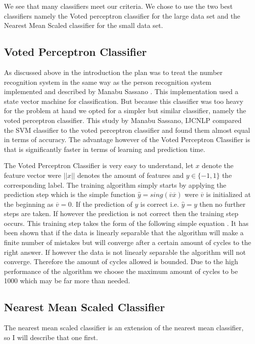 \documentclass[%
        compressed,
        final,
        notitlepage,
        narroweqnarray,
        inline,
        twoside,
        ]{ieee}
\begin{document}
We see that many classifiers meet our criteria. We chose to use the two best
classifiers namely the Voted perceptron classifier for the large data set and
the Nearest Mean Scaled classifier for the small data set.

\subsection{Voted Perceptron Classifier}
As discussed above in the introduction the plan was to treat the number
recognition system in the same way as the person recognition system implemented
and described by Manabu Sassano \cite{Manabu}.
This implementation used a state vector machine for classification. But because
this classifier was too heavy for the problem at hand we opted for a simpler but
similar classifier, namely the voted perceptron classifier. This study by Manabu
Sassano, IJCNLP compared the SVM classifier to the voted perceptron classifier
and found them almost equal in terms of accuracy. The advantage however of the
Voted Perceptron Classifier is that is significantly faster in terms of learning
and prediction time.

The Voted Perceptron Classifier is very easy to understand, let $x$ denote the
feature vector were $||x||$ denotes the amount of features and $y \in \{-1,1\}$
the corresponding label. The training algorithm simply starts by applying the
prediction step which is the simple function $\hat{y} =
sing(\overline{v}\overline{x})$ were $\overline{v}$ is
initialized at the beginning as $\overline{v}=0$. If the prediction of $y$ is correct i.e.
$\hat{y}=y$
then no further steps are taken. If however the prediction is not correct then
the training step occurs. This training step takes the form of the following
simple equation . It has been shown that if the data is linearly separable that
the algorithm will make a finite number of mistakes but will converge after a
certain amount of cycles to the right answer. If however the data is not
linearly separable the algorithm will not converge. Therefore the amount of
cycles allowed is bounded. Due to the high performance of the algorithm we
choose the maximum amount of cycles to be 1000 which may be far more than
needed.

\subsection{Nearest Mean Scaled Classifier}
The nearest mean scaled classifier is an extension of the nearest mean
classifier, so I will describe that one first.
\end{document}
